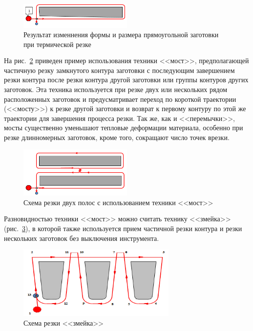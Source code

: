 \documentclass[11pt,twoside,openany]{report}
\begin{document}
\begin{figure}[h]
  \begin{center}
  \includegraphics[width=0.5\textwidth]{saber.png}
  \caption{Результат изменнения формы и размера прямоугольной заготовки при термической резке}
  \label{saber}
  \end{center}
\end{figure}

На рис.~\ref{bridge}
приведен пример использования техники <<мост>>,
предполагающей  частичную резку замкнутого контура
заготовки с последующим завершением резки контура
после резки контура другой заготовки или
группы контуров других заготовок.
Эта техника используется при резке двух или
нескольких рядом расположенных заготовок и
предусматривает переход по короткой траектории (<<мосту>>)
к резке другой заготовки и возврат к первому контуру
по этой же траектории для завершения процесса резки.
Так же, как и <<перемычки>>,
мосты существенно уменьшают тепловые деформации материала,
особенно при резке длинномерных заготовок,
кроме того, сокращают число точек врезки.

\begin{figure}[h]
  \begin{center}
  \includegraphics[width=0.5\textwidth]{bridge.png}
  \caption{Схема резки двух полос с использованием техники <<мост>>}
  \label{bridge}
  \end{center}
\end{figure}

Разновидностью техники <<мост>> можно считать технику <<змейка>>
(рис.~\ref{snake}),
в которой также используется прием
частичной резки контура и резки
нескольких заготовок без выключения инструмента.

\begin{figure}[h]
  \begin{center}
  \includegraphics[width=0.7\textwidth]{snake.png}
  \caption{Схема резки <<змейка>>}
  \label{snake}
  \end{center}
\end{figure}
\end{document}
